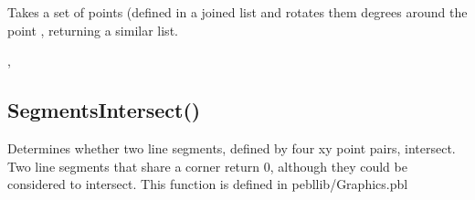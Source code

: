 \documentclass[letterpaper,10pt,english]{sphinxmanual}
\begin{document}
\sphinxAtStartPar
Takes a set of points (defined in a joined list  \sphinxcode{\sphinxupquote{{[}{[}x1,x2,x3,...{]},}} \sphinxcode{\sphinxupquote{{[}y1,y2,y3,...{]}{]}}} and rotates them  degrees around the point \sphinxcode{\sphinxupquote{{[}0,0{]}}},  returning a similar \sphinxcode{\sphinxupquote{{[}{[}x{]},{[}y{]}{]}}} list.

\sphinxAtStartPar
{}

\begin{sphinxVerbatim}[commandchars=\\\{\}]
\end{sphinxVerbatim}

\sphinxAtStartPar
{}

\begin{sphinxVerbatim}[commandchars=\\\{\}]
\PYG{p}{[}\PYG{p}{[}\PYG{p}{]}\PYG{p}{[}\PYG{p}{]}\PYG{p}{]}
\end{sphinxVerbatim}

\sphinxAtStartPar
{}

\sphinxAtStartPar
{}, 

\ignorespaces 

\subsection{SegmentsIntersect()}
\label{\detokenize{reference/graphics:segmentsintersect}}\label{\detokenize{reference/graphics:index-18}}
\sphinxAtStartPar
{}

\sphinxAtStartPar
{}

\sphinxAtStartPar
Determines whether two line segments, defined by   four xy point pairs, intersect. Two line segments that share a   corner return 0, although they could be considered to intersect.  This function is defined in pebl\sphinxhyphen{}lib/Graphics.pbl
\end{document}
